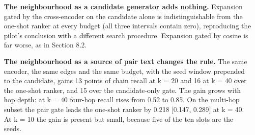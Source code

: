 \documentclass[11pt]{article}
\begin{document}
\begin{table}[t]
\centering\small
\setlength{\tabcolsep}{4pt}
\caption{Budgeted expansion with three gates versus one-shot ranking at matched k (n = 300; K $\geq$ 2 subset n = 225).}
\end{table}

\textbf{The neighbourhood as a candidate generator adds nothing.} Expansion gated by the cross-encoder on the candidate alone is indistinguishable from the one-shot ranker at every budget (all three intervals contain zero), reproducing the pilot's conclusion with a different search procedure. Expansion gated by cosine is far worse, as in Section 8.2.

\textbf{The neighbourhood as a source of pair text changes the rule.} The same encoder, the same edges and the same budget, with the seed window prepended to the candidate, gains 13 points of chain recall at k = 20 and 16 at k = 40 over the one-shot ranker, and 15 over the candidate-only gate. The gain grows with hop depth: at k = 40 four-hop recall rises from 0.52 to 0.85. On the multi-hop subset the pair gate leads the one-shot ranker by 0.218 [0.147, 0.289] at k = 40. At k = 10 the gain is present but small, because five of the ten slots are the seeds.
\end{document}
